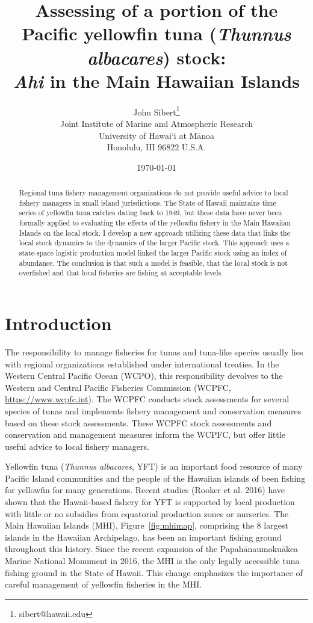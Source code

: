 \documentclass[12pt,letterpaper]{article}
\title{Assessing of a portion of the Pacific yellowfin tuna 
({\it Thunnus albacares}) stock:\\[0.125in]
{\it Ahi} in the Main Hawaiian Islands}
\author{
John Sibert\thanks{sibert@hawaii.edu}\\
Joint Institute of Marine and Atmospheric Research\\
University of Hawai`i at M\={a}noa\\
Honolulu, HI  96822 U.S.A.\\[0.125in]
\date{\today}
}
\newcommand\doublespacing{\baselineskip=1.6\normalbaselineskip}
\begin{document}
\maketitle


\begin{abstract}
Regional tuna fishery management organizations do not provide useful
advice to local fishery managers in small island jurisdictions. The
State of Hawaii maintains time series of yellowfin tuna catches dating
back to 1949, but these data have never been formally applied to
evaluating the effects of the yellowfin fishery in the Main Hawaiian
Islands on the local stock. I develop a new approach utilizing these
data that links the local stock dynamics to the dynamics of the larger
Pacific stock. This approach uses a state-space logistic production
model linked the larger Pacific stock using an index of abundance. The
conclusion is that such a model is feasible, that the local stock
is not overfished and that local fisheries are fishing at acceptable
levels.
\end{abstract}


\section*{Introduction}
The responsibility to manage fisheries for tunas and tuna-like
species usually
lies with regional organizations established under international treaties.
In the Western Central Pacific Ocean (WCPO), this responsibility devolves to
the Western and Central Pacific Fisheries Commission (WCPFC, 
\url{https://www.wcpfc.int}).
The WCPFC conducts stock assessments for several species of tunas and
implements fishery management and conservation measures based on
these stock assessments. These
WCPFC stock assessments and conservation and management measures
inform the WCPFC, but offer little useful advice to local fishery managers.

Yellowfin tuna ({\it Thunnus albacares}, YFT) is an important food resource
of many Pacific Island communities and the people of the Hawaiian
islands of been fishing for yellowfin for many generations. 
Recent studies (Rooker et al. 2016) have shown that the Hawaii-based
fishery for YFT is  supported by
local production with little or no subsidies from equatorial
production zones or nurseries.
The Main Hawaiian Islands (MHI), Figure~\ref{fig:mhimap},
comprising the 8 largest islands in the Hawaiian Archipelago,
has been an important fishing ground throughout this history.
Since the recent expansion of the Papah\={a}naumoku\={a}kea Marine National
Monument in 2016, the MHI is the only legally accessible tuna fishing ground
in the State of Hawaii.
This change emphasizes the importance of careful management of yellowfin
fisheries in the MHI.
\end{document}
